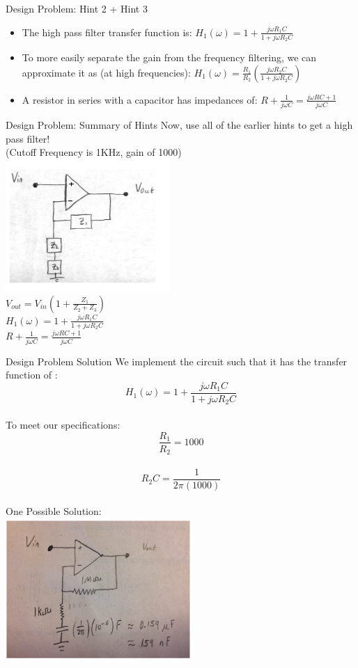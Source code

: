     \begin{frame}{Design Problem: Hint 2 + Hint 3}
        \begin{itemize}
            \item The high pass filter transfer function is: $H_1(\omega) = 1 + \frac{j\omega R_1C}{1 + j\omega R_2C}$
            \item To more easily separate the gain from the frequency filtering, we can approximate it as (at high frequencies): $H_1(\omega) = \frac{R_1}{R_2}(\frac{j\omega R_2C}{1 + j\omega R_2 C})$
            \item A resistor in series with a capacitor has impedances of: $R + \frac{1}{j\omega C} = \frac{j \omega RC +1}{j\omega C}$
        \end{itemize}
    \end{frame}
    \begin{frame}{Design Problem: Summary of Hints}
    Now, use all of the earlier hints to get a high pass filter!\\
    (Cutoff Frequency is 1KHz, gain of 1000)\\
    \includegraphics[scale=0.75]{./images/design-problem-summary.png}\\
    $V_{out} = V_{in}(1 + \frac{Z_1}{Z_2+Z_3})$\\
    $H_1(\omega) = 1 + \frac{j\omega R_1 C}{1 + j \omega R_2 C}$ \\
    $R + \frac{1}{j\omega C} = \frac{j \omega RC + 1}{j \omega C}$
    \end{frame}
    \begin{frame}{Design Problem Solution}
        We implement the circuit such that it has the transfer function of :\\
        $$H_1(\omega) = 1 + \frac{j\omega R_1C}{1 + j\omega R_2C}$$\\
        To meet our specifications: \\
        $$\frac{R_1}{R_2} = 1000$$ \\
        $$R_2C = \frac{1}{2\pi(1000)}$$\\
        One Possible Solution: \\
        \includegraphics[scale=0.65]{./images/design-problem-solution.png}
    \end{frame}

